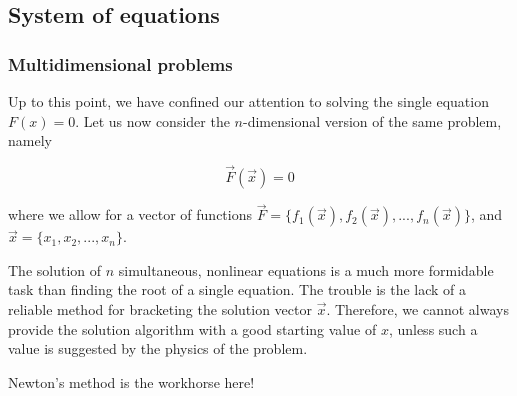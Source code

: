 \documentclass[hyperref={colorlinks=true}]{beamer}
\begin{document}
\subsection[System of equations]{System of equations}

\begin{frame}%
  \frametitle{Multidimensional problems}

  Up to this point, we have confined our attention to solving the single equation $F(x) = 0$. Let us now consider the $n$-dimensional version of the same problem, namely
  
  \begin{equation}
    \vec{F}(\vec{x}) = 0
  \end{equation}

  where we allow for a vector of functions $\vec{F} = \{f_1(\vec{x}), f_2(\vec{x}), ..., f_n(\vec{x})\}$, and $\vec{x} = \{ x_1, x_2, ..., x_{n} \}$.
  
  \mysp
  
  The solution of $n$ simultaneous, nonlinear equations is a much more formidable task than finding the root of a single equation. The trouble is the lack of a reliable method for bracketing the solution vector $\vec{x}$. Therefore, we cannot always provide the solution algorithm with a good starting value of $x$, unless such a value is suggested by the physics of the problem.
  
  \mysp
  
  Newton's method is the workhorse here!
  

\end{frame}

\end{document}
